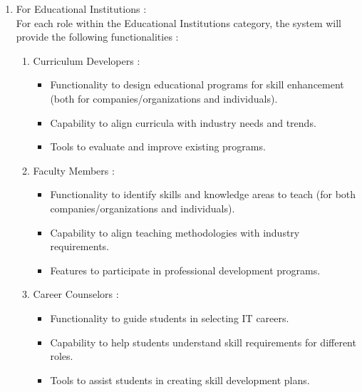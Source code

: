 \begin{enumerate}
    \item For Educational Institutions : \\
          For each role within the Educational Institutions category, the system will provide the following functionalities :
          \begin{enumerate}
              \item Curriculum Developers : \\
                    \begin{itemize}
                        \renewcommand\labelitemi{-}
                        \item Functionality to design educational programs for skill enhancement (both for companies/organizations and individuals).
                        \item Capability to align curricula with industry needs and trends.
                        \item Tools to evaluate and improve existing programs.
                    \end{itemize}
              \item Faculty Members : \\
                    \begin{itemize}
                        \renewcommand\labelitemi{-}
                        \item Functionality to identify skills and knowledge areas to teach (for both companies/organizations and individuals).
                        \item Capability to align teaching methodologies with industry requirements.
                        \item Features to participate in professional development programs.
                    \end{itemize}
              \item Career Counselors : \\
                    \begin{itemize}
                        \renewcommand\labelitemi{-}
                        \item Functionality to guide students in selecting IT careers.
                        \item Capability to help students understand skill requirements for different roles.
                        \item Tools to assist students in creating skill development plans.
                    \end{itemize}

\end{enumerate}
\end{enumerate}
